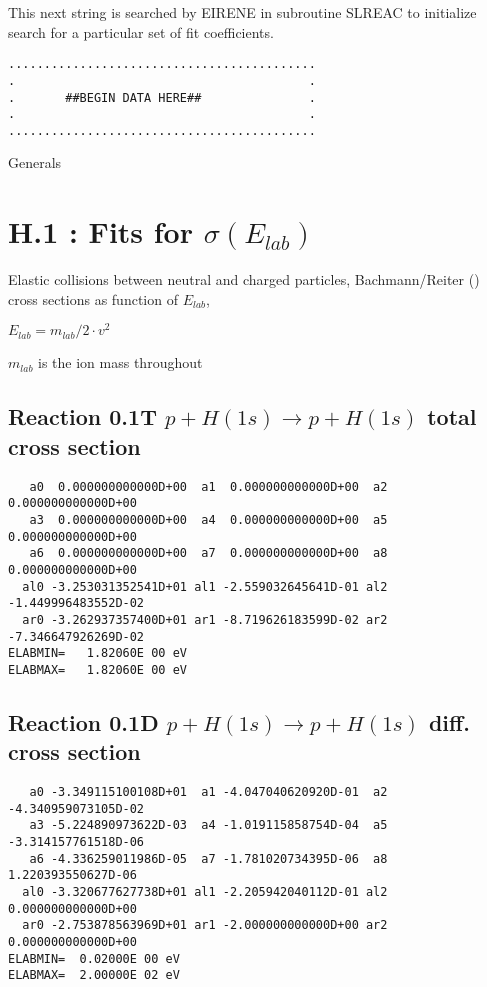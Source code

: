 This next string is searched by EIRENE in subroutine SLREAC
to initialize search for a particular set of fit coefficients.

\bigskip
\begin{verbatim}
...........................................
.                                         .
.       ##BEGIN DATA HERE##               .
.                                         .
...........................................
\end{verbatim}
\newpage
Generals
\newpage

\section{H.1 :  Fits for  \quad   $\sigma(E_{lab})$}

\bigskip
Elastic collisions between neutral and charged particles,
Bachmann/Reiter (\cite{kn:Bachmann})
cross sections as function of $E_{lab}$,

$E_{lab} = m_{lab}/2 \cdot v^2$

$m_{lab}$ is the ion mass throughout

\subsection{
Reaction 0.1T $p + H (1s) \rightarrow p + H (1s) $ total cross
section}

\begin{verbatim}
   a0  0.000000000000D+00  a1  0.000000000000D+00  a2  0.000000000000D+00
   a3  0.000000000000D+00  a4  0.000000000000D+00  a5  0.000000000000D+00
   a6  0.000000000000D+00  a7  0.000000000000D+00  a8  0.000000000000D+00
  al0 -3.253031352541D+01 al1 -2.559032645641D-01 al2 -1.449996483552D-02
  ar0 -3.262937357400D+01 ar1 -8.719626183599D-02 ar2 -7.346647926269D-02
ELABMIN=   1.82060E 00 eV
ELABMAX=   1.82060E 00 eV
\end{verbatim}



\subsection{
Reaction 0.1D    $ p + H (1s) \rightarrow p + H (1s)$  diff. cross
section}


\begin{verbatim}
   a0 -3.349115100108D+01  a1 -4.047040620920D-01  a2 -4.340959073105D-02
   a3 -5.224890973622D-03  a4 -1.019115858754D-04  a5 -3.314157761518D-06
   a6 -4.336259011986D-05  a7 -1.781020734395D-06  a8  1.220393550627D-06
  al0 -3.320677627738D+01 al1 -2.205942040112D-01 al2  0.000000000000D+00
  ar0 -2.753878563969D+01 ar1 -2.000000000000D+00 ar2  0.000000000000D+00
ELABMIN=  0.02000E 00 eV
ELABMAX=  2.00000E 02 eV
\end{verbatim}


